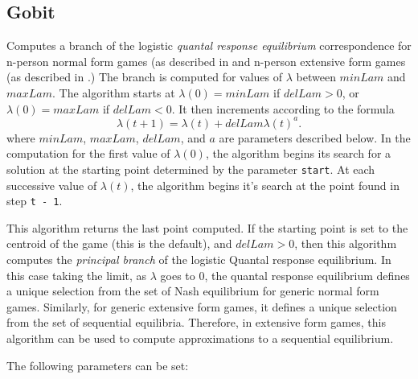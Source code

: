 \subsection{Gobit}\label{Gobit}
Computes a branch of the logistic {\em quantal response equilibrium} 
correspondence for n-person normal form games (as described 
in \cite{McKPal:95a}  and n-person extensive form games (as described 
in \cite{McKPal:95b}.) The branch is computed 
for values of $\lambda$ between $minLam$ and $maxLam$.  The algorithm 
starts at $\lambda(0) = minLam$ if $delLam > 0$, or 
$\lambda(0) = maxLam$ if 
$delLam < 0$. It then increments according to the formula 
$$
\lambda(t+1) = \lambda(t) +delLam \lambda(t)^a.
$$
where $minLam$, $maxLam$, $delLam$, and $a$ are
parameters described below. In the computation for the first value of
$\lambda(0)$, the algorithm begins its search for a solution at the
starting point determined by the parameter \verb+start+.  At each
successive value of $\lambda(t)$, the algorithm begins it's search at
the point found in step \verb+t - 1+.  

This algorithm returns the last point computed.  
If the starting point is set to the centroid of the game (this is the
default), and $delLam > 0$, then this algorithm computes the {\em principal
branch} of the logistic Quantal response equilibrium.  In this case
taking the limit, as $\lambda$ goes to 0, the quantal response equilibrium
defines a unique selection from the set of Nash equilibrium for generic
normal form games.  Similarly, for generic extensive form games, it
defines a unique selection from the set of sequential equilibria.
Therefore, in extensive form games, this algorithm can be used to compute
approximations to a sequential equilibrium.

The following parameters can be set:

